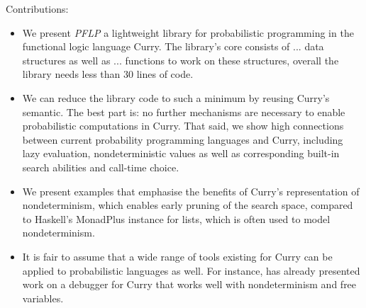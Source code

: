\documentclass[
12pt, %
a4paper, %
oneside, %
]{llncs}
\begin{document}


Contributions:
\begin{itemize}
\item We present \emph{PFLP} a lightweight library for probabilistic
  programming in the functional logic language Curry. %
  The library's core consists of ... data structures as well as
  ... functions to work on these structures, overall the library needs
  less than 30 lines of code. %
\item We can reduce the library code to such a minimum by reusing Curry's
  semantic. %
  The best part is: no further mechanisms are necessary to enable
  probabilistic computations in Curry. %
  That said, we show high connections between current probability
  programming languages and Curry, including lazy evaluation,
  nondeterministic values as well as corresponding built-in search
  abilities and call-time choice. %
\item We present examples that emphasise the benefits of Curry's
  representation of nondeterminism, which enables early pruning of the
  search space, compared to Haskell's MonadPlus instance for lists,
  which is often used to model nondeterminism. %
\item It is fair to assume that a wide range of tools existing for
  Curry can be applied to probabilistic languages as well. %
  For instance, \cite{Brassel-BIO} has already presented work on a
  debugger for Curry that works well with nondeterminism and free
  variables. %
\end{itemize}
\end{document}
